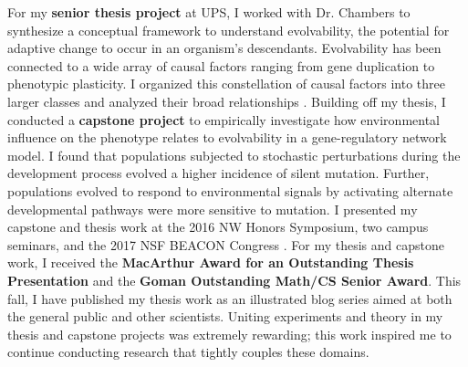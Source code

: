 For my \textbf{senior thesis project} at UPS, I worked with Dr. Chambers to synthesize a conceptual framework to understand evolvability, the potential for adaptive change to occur in an organism's descendants.
Evolvability has been connected to a wide array of causal factors ranging from gene duplication to phenotypic plasticity.
I organized this constellation of causal factors into three larger classes and analyzed their broad relationships \cite{thesis}.
Building off my thesis, I conducted a \textbf{capstone project} to empirically investigate how environmental influence on the phenotype relates to evolvability in a gene-regulatory network model.
I found that populations subjected to stochastic perturbations during the development process evolved a higher incidence of silent mutation.
Further, populations evolved to respond to environmental signals by activating alternate developmental pathways were more sensitive to mutation.
I presented my capstone and thesis work at the 2016 NW Honors Symposium, two campus seminars, and the 2017 NSF BEACON Congress \cite{beacon}.
For my thesis and capstone work, I received the \textbf{MacArthur Award for an Outstanding Thesis Presentation} and the \textbf{Goman Outstanding Math/CS Senior Award}.
This fall, I have published my thesis work as an illustrated blog series aimed at both the general public and other scientists.
Uniting experiments and theory in my thesis and capstone projects was extremely rewarding;
this work inspired me to continue conducting research that tightly couples these domains.
